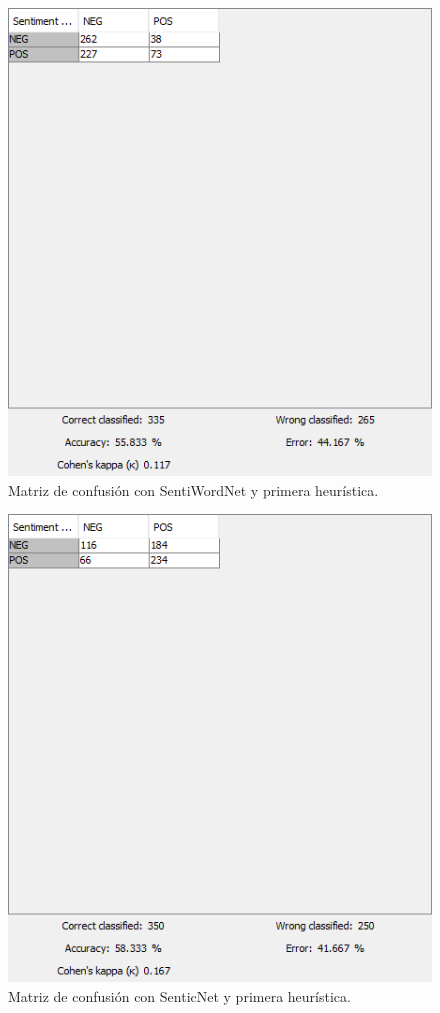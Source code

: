 \begin{figure}[H]
    \center\includegraphics[width=.95\linewidth]{img/analysis/score2.png}
    \caption{Matriz de confusión con SentiWordNet y primera heurística.}
\end{figure}

\begin{figure}[H]
    \center\includegraphics[width=.95\linewidth]{img/analysis/score3.png}
    \caption{Matriz de confusión con SenticNet y primera heurística.}
\end{figure}

